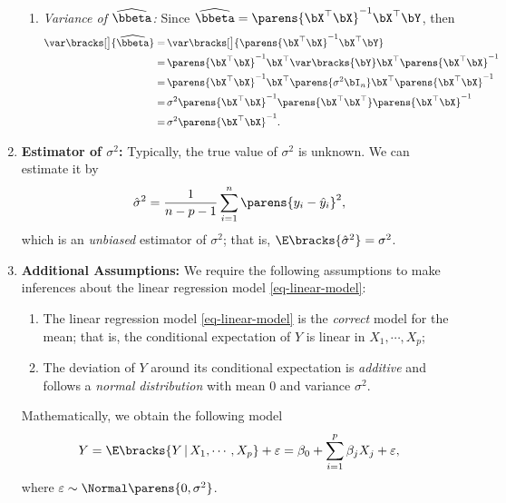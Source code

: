 \documentclass[12pt]{article}
\begin{document}
\begin{enumerate}[label=\textbf{\arabic*.}]
\begin{enumerate}
		\item \textit{Variance of $\widehat{\bbeta}$:} Since $\widehat{\bbeta} = \parens{\bX^\top \bX}^{-1} \bX^\top \bY$, then
		\begin{align*}
			\var \bracks[\big]{\widehat{\bbeta}} = & \, \var \bracks[\big]{\parens{\bX^\top \bX}^{-1} \bX^\top \bY} \\ 
			= & \, \parens{\bX^\top \bX}^{-1} \bX^\top \var \bracks{\bY} \bX^\top \parens{\bX^\top \bX}^{-1} \\ 
			= & \, \parens{\bX^\top \bX}^{-1} \bX^\top \parens{\sigma^2 \bI_n} \bX^\top \parens{\bX^\top \bX}^{-1} \\ 
			= & \, \sigma^2 \parens{\bX^\top \bX}^{-1} \parens{\bX^\top \bX^\top} \parens{\bX^\top \bX}^{-1} \\ 
			= & \, \sigma^2 \parens{\bX^\top \bX}^{-1}. 
		\end{align*}
	\end{enumerate}
	
	\item \textbf{Estimator of $\sigma^2$:} Typically, the true value of $\sigma^2$ is unknown. We can estimate it by 
	\begin{align*}
		\hat{\sigma}^2 = \frac{1}{n-p-1} \sum_{i=1}^n \parens{y_i - \hat{y}_i}^2, 
	\end{align*}
	which is an \emph{unbiased} estimator of $\sigma^2$; that is, $\E \bracks{\hat{\sigma}^2} = \sigma^2$. 
	
	\item \textbf{Additional Assumptions:} We require the following assumptions to make inferences about the linear regression model \eqref{eq-linear-model}: 
	\begin{enumerate}
		\item The linear regression model \eqref{eq-linear-model} is the \emph{correct} model for the mean; that is, the conditional expectation of $Y$ is linear in $X_1, \cdots, X_p$; 
		\item The deviation of $Y$ around its conditional expectation is \textit{additive} and follows a \textit{normal distribution} with mean 0 and variance $\sigma^2$. 
	\end{enumerate}
	Mathematically, we obtain the following model 
	\begin{align}\label{eq-linear-reg-error}
		Y = \E \bracks{Y \,\vert\, X_1, \cdots, X_p} + \varepsilon = \beta_0 + \sum_{i=1}^p \beta_j X_j + \varepsilon, 
	\end{align}
	where $\varepsilon \sim \Normal \parens{0, \sigma^2}$. 
	

\end{enumerate}
\end{document}
